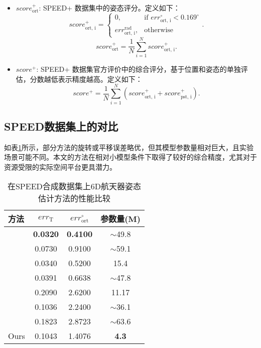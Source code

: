 \begin{itemize}
	\item $score_{\text{ort}}^+$: SPEED+ 数据集中的姿态评分。定义如下：
	\begin{equation}
		score_{\text{ort, i}}^+ = 
		\begin{cases}
			0, & \text{if } err_{\text{ort, i}}^{\circ} < 0.169^\circ \\
			err_{\text{ort, i}}^{\text{rad}}, & \text{otherwise}
		\end{cases}.
	\end{equation}
	\begin{equation}
		score_{\text{ort}}^+ = \frac{1}{N}\sum\limits_{i=1}^N score_{\text{ort, i}}^+.
	\end{equation}
	
	\item $score^+$: SPEED+ 数据集官方评价中的综合评分，基于位置和姿态的单独评估，分数越低表示精度越高。定义如下：
	\begin{equation}
		score^+ = \frac{1}{N}\sum\limits_{i=1}^N(score_{\text{ort, i}}^+ + score_{\text{pst, i}}^+).
	\end{equation}
	
\end{itemize}


\subsection{SPEED数据集上的对比}
如表\ref{tab:SPEED_Comparison}所示，部分方法的旋转或平移误差略优，但其模型参数量相对巨大，且实验场景可能不同。本文的方法在相对小模型条件下取得了较好的综合精度，尤其对于资源受限的实际空间平台更具潜力。
\begin{table}[htbp]
	\centering
	\caption{在SPEED合成数据集上6D航天器姿态估计方法的性能比较}
	\label{tab:SPEED_Comparison}
	\begin{tabular}{lccc}
		\toprule
		方法 & $err_{\text{T}}$ & $err_{\text{ort}}^{\circ}$ & 参数量(M) \\
		\midrule
		\citet{chen2019satellite} & \textbf{0.0320} & \textbf{0.4100} & $\sim$49.8 \\
		\citet{gerard2019segmentation} & 0.0730 & 0.9100 & $\sim$59.1 \\
		\citet{lotti2022investigating} & 0.0340 & 0.5200 & 15.4 \\
		\citet{wang2022revisiting} & 0.0391 & 0.6638 & $\sim$47.8 \\
		\citet{park2019towards} & 0.2090 & 2.6200 & 11.17 \\
		\citet{piazza2021deep} & 0.1036 & 2.2400 & $\sim$36.1 \\
		\citet{huan2020pose} & 0.1823 & 2.8723 & $\sim$63.6 \\
		Ours & 0.1043 & 1.4076 & \textbf{4.3} \\
		\bottomrule
	\end{tabular}
\end{table}
